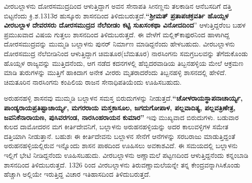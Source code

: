 ವೀರಬಲ್ಲಾಳನು ದೋರಸಮುದ್ರದಿಂದ ಆಳುತ್ತಿದ್ದಾಗ ಅವನ ಸೇನಾಪತಿ ಸೀನಣ್ಣನು ತಲಕಾಡಿನ ಆನೆಬಸದಿಗೆ ದತ್ತಿ ಬಿಟ್ಟನೆಂದು ಕ್ರಿ.ಶ.1313ರ ಹುಸ್ಕೂರು ಶಾಸನದಿಂದ ತಿಳಿದುಬರುತ್ತದೆ.\textbf{“ಶ‍್ರೀಮತ್​ ಪ್ರತಾಪಚಕ್ರವರ್ತಿ ಹೊಯ್ಸಳ ವೀರಬಲ್ಲಾಳ ದೇವರಸರು ದೋರಸಮುದ್ರದ ನೆಲೆಬೀಡಂ ಕಟ್ಟಿ ಸುಖಸಂಕಥಾ ವಿನೋದದಿಂದ}” ಆಳುತ್ತಿದ್ದರೆಂಬ ಬಹಳ ಪ್ರಮುಖ\-ವಾದ ವಿಷಯ ಗುತ್ತಲು ಶಾಸನದಿಂದ ತಿಳಿದುಬರುತ್ತದೆ. ಈ ವೇಳೆಗೆ ಮಲ್ಲಿಕ್​ಕಾಫುರನಿಂದ ಹಾಳಾಗಿದ್ದ ದೋರಸಮುದ್ರವನ್ನು ಮುಮ್ಮಡಿ ಬಲ್ಲಾಳನು ಪುನರ್​ ನಿರ್ಮಾಣ ಮಾಡಿದ್ದನೆಂದು ಹೇಳಬಹುದು. ವೀರಬಲ್ಲಾಳನು ದೋರಸಮುದ್ರ ನೆಲೆಬೀಡಿನಿಂದ ಆಳುತ್ತಿದ್ದಾಗ ಚಿಮತೂರ(ಬೆಮತೂರ) ನಾರಸಿಂಗನು ಸಮಗ್ರಬಲವನ್ನು ತೆಗೆದುಕೊಂಡು ಹೊಯ್ಸಳ ರಾಜ್ಯವನ್ನು ಮುತ್ತಿದನೆಂದು, ಆಗ ನಡೆದ ಕದನಗಳಲ್ಲಿ ಹೆಬ್ಬಿದರವಾಡಿಯ ತಿಬ್ಬನಹಳ್ಳಿಯ ಮೇಲೆ ಆಕ್ರಮಣ ಮಾಡಿ ತುರುಗಳನ್ನು ಮುತ್ತಿಗೆ ಹಾಕಿದಾಗ ಅನೇಕ ವೀರರು ಮೃತರಾದರೆಂದು ತಿಬ್ಬನಹಳ್ಳಿ ಶಾಸನದಲ್ಲಿ ಹೇಳಿದೆ. ಚಿಮತೂರಿನ ನಾರಸಿಂಗನು ಕಂಪಿಲಿಯ ರಾಜನ ಸೇನಾಧಿಪತಿಯೆಂದು ಊಹಿಸಬಹುದು.

ಅರುಹನಹಳ್ಳಿ ಶಾಸನವು ಮುಮ್ಮಡಿ ಬಲ್ಲಾಳನ ಸಮಸ್ತ ಬಿರುದುಗಳನ್ನು ನೀಡುತ್ತದೆ.\textbf{“ಚೋಳರಾಯಸ್ಥಾಪನಾ\-ಚಾರ್ಯ್ಯ, ಪಾಂಡ್ಯರಾಯಪ್ರತಿಷ್ಟಾಚಾರ್ಯ್ಯ, ಮಗರರಾಯ ಮಸ್ತಕಾಸೂಲ, ಜಗದುಗೋಪಾಳ, ಪಲ್ಲವಾದಿತ್ಯ, ಪಲ್ಲವತ್ರಿಣೇತ್ರ,\general{\break } ಜವನಿಕೆನಾರಾಯಣ, ಪುಸಿವರಗಂಡ, ನಾರಸಿಂಹರಾಯನ ಕುಮಾರ”} ಇವು ಮುಖ್ಯವಾದ ಬಿರುದುಗಳು. ಬಡುವಾರ ಕುಲದ ದಾಮೋದರನ ಮಗ ಕೀರ್ತಿದೇವನಿಗೆ, ಬಲ್ಲಾಳನು ಅರುಹನಹಳ್ಳಿಯನ್ನು ಅದರ ಕಾಲುವಳ್ಳಿಗಳ ಸಮೇತ ದತ್ತಿಯಾಗಿ ನೀಡುತ್ತಾನೆ. ಬಹುಶಃ ಈ ಕೀರ್ತಿದೇವನು ಬಲ್ಲಾಳನ ಸೇನೆಗೆ ಆನೆಗಳನ್ನು ಸರಬರಾಜು ಮಾಡುತ್ತಿದ್ದಂತೆ ಅರುಹನಹಳ್ಳಿಯಲ್ಲಿರುವ ಇನ್ನೊಂದು ಶಾಸನ ಪಾಠದಿಂದ ಊಹಿಸಲು ಅವಕಾಶವಿದೆ. ಈ ಸಮಯದಲ್ಲಿ ಬಲ್ಲಾಳನು ಇಲ್ಲಿಗೆ ಭೇಟಿ ನೀಡಿದ್ದನೆಂದು ಊಹಿಸಬಹುದು. ವೀರಬಲ್ಲಾಳನು ಅಣ್ಣಾಮಲೆ ಪಟ್ಟಣದಿಂದ ಆಳುತ್ತಿದ್ದನೆಂದು ಕನ್ನಂಬಾಡಿ ಶಾಸನದಿಂದ ತಿಳಿದುಬರುತ್ತದೆ. 1326 ರಿಂದ ವೀರಬಲ್ಲಾಳನು ತಿರುವಣ್ಣಾಮಲೆಯನ್ನೇ ತನ್ನ ಕೇಂದ್ರವನ್ನಾಗಿಸಿಕೊಂಡು ಹೆಚ್ಚಾಗಿ ಅಲ್ಲಿಯೇ ಇರುತ್ತಿದ್ದ ವಿಚಾರ ಇತಿಹಾಸದಿಂದ ತಿಳಿದುಬರುತ್ತದೆ.

